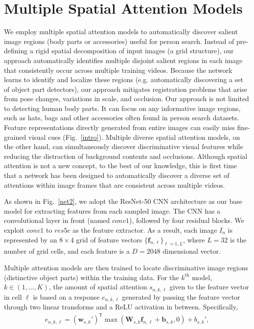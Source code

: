 \section{Multiple Spatial Attention Models}
\label{sec:mrsa}
We employ multiple spatial attention models to automatically discover salient image regions (body parts or accessories) useful for person search.
Instead of pre-defining a rigid spatial decomposition of input images (\eg a grid structure), our approach automatically identifies multiple disjoint salient regions in each image that consistently occur across multiple training videos.  Because the network learns to identify and localize these regions (e.g. automatically discovering a set of object part detectors), our approach mitigates registration problems that arise from pose changes, variations in scale, and occlusion. 
Our approach is not limited to detecting human body parts. It can focus on any informative image regions, such as hats, bags and other accessories often found in person search datasets. 
Feature representations directly generated from entire images can easily miss fine-grained visual cues (Fig.~\ref{intro}).  
Multiple diverse spatial attention models, on the other hand, can simultaneously discover discriminative visual features while reducing the distraction of background contents and occlusions. Although spatial attention is not a new concept, to the best of our knowledge, this is first time that a network has been designed to automatically discover a diverse set of attentions within image frames that are consistent across multiple videos.

As shown in Fig.~\ref{net2}, we adopt the ResNet-50 CNN architecture \cite{he2016deep} as our base model for extracting features from each sampled image. The CNN has a convolutional layer in front (named $conv1$), followed by four residual blocks. We exploit $conv1$ to $res5c$ as the feature extractor.  As a result, each image $I_n$ is represented by an $8\times4$ grid of feature vectors $\{ \mathbf{f}_{n,\ell} \}_{\ell=1,L}$, where $L=32$ is the number of grid cells, and each feature is a $D=2048$ dimensional vector.

Multiple attention models are then trained to locate discriminative image regions (distinctive object parts) within the training data. For the $k^\text{th}$ model, $k \in (1, \ldots, K)$, the amount of spatial attention $s_{n,k,\ell}$ given to the feature vector in cell $\ell$ is based on a response $e_{n,k,\ell}$ generated by passing the feature vector through two linear transforms and a ReLU activation in between. Specifically, 
%
\begin{align}
e_{n,k,\ell} = (\mathbf{w}_{s,k}')^\mathsf{T} \max( \mathbf{W}_{s,k} \mathbf{f}_{n,\ell} + \mathbf{b}_{s,k}, 0) + b_{s,k}',
\label{eqn:spatial-activation}
\end{align}

